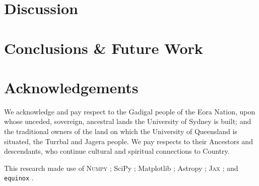 \documentclass[twocolumn]{spie}
\begin{document}




\section{Discussion}

\section{Conclusions \& Future Work}




\section{Acknowledgements}

We acknowledge and pay respect to the Gadigal people of the Eora Nation, upon whose unceded, sovereign, ancestral lands the University of Sydney is built; and the traditional owners of the land on which the University of Queensland is situated, the Turrbal and Jagera people. We pay respects to their Ancestors and descendants, who continue cultural and spiritual connections to Country. 

This research made use of \textsc{Numpy} \cite{numpy}; SciPy \cite{scipy}; Matplotlib \cite{matplotlib}; Astropy \cite{astropy:2013,astropy:2018}; \textsc{Jax} \cite{jax}; and \texttt{equinox} \cite{kidger2021equinox}.


\end{document}
